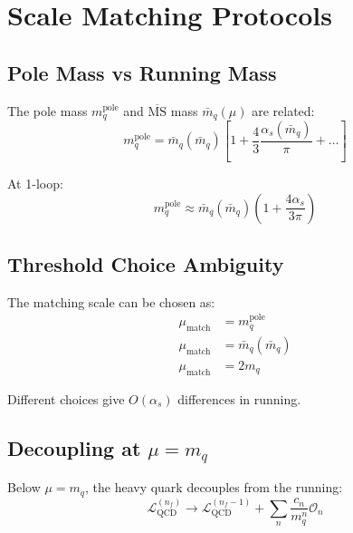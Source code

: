 \documentclass[11pt,a4paper]{article}
\theoremstyle{definition}
\begin{document}
\section{Scale Matching Protocols}
\label{app:scale-matching}

\subsection{Pole Mass vs Running Mass}
\label{subsec:pole-running}

The pole mass $m_q^{\text{pole}}$ and $\overline{\text{MS}}$ mass $\bar{m}_q(\mu)$ are related:
\begin{equation}
\label{eq:pole-running-rel}
m_q^{\text{pole}} = \bar{m}_q(\bar{m}_q)\left[1 + \frac{4}{3}\frac{\alpha_s(\bar{m}_q)}{\pi} + \ldots\right]
\end{equation}

At 1-loop:
\begin{equation}
\label{eq:pole-1loop}
m_q^{\text{pole}} \approx \bar{m}_q(\bar{m}_q)\left(1 + \frac{4\alpha_s}{3\pi}\right)
\end{equation}

\subsection{Threshold Choice Ambiguity}
\label{subsec:threshold-ambig}

The matching scale can be chosen as:
\begin{align}
\label{eq:thresh-pole}
\mu_{\text{match}} &= m_q^{\text{pole}} \\
\label{eq:thresh-msbar}
\mu_{\text{match}} &= \bar{m}_q(\bar{m}_q) \\
\label{eq:thresh-2m}
\mu_{\text{match}} &= 2m_q
\end{align}

Different choices give $O(\alpha_s)$ differences in running.

\subsection{Decoupling at $\mu = m_q$}
\label{subsec:decoupling}

Below $\mu = m_q$, the heavy quark decouples from the running:
\begin{equation}
\label{eq:decouple}
\mathcal{L}_{\text{QCD}}^{(n_f)} \to \mathcal{L}_{\text{QCD}}^{(n_f-1)} +
  \sum_n \frac{c_n}{m_q^n}\mathcal{O}_n
\end{equation}
\end{document}
